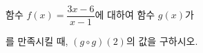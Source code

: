 함수 $f(x)=\dfrac{3x-6}{x-1}$에 대하여 함수 $g(x)$가 \par\smallskip{}\par\smallskip\noindent 를 만족시킬 때, $(g\circ g)(2)$의 값을 구하시오.
